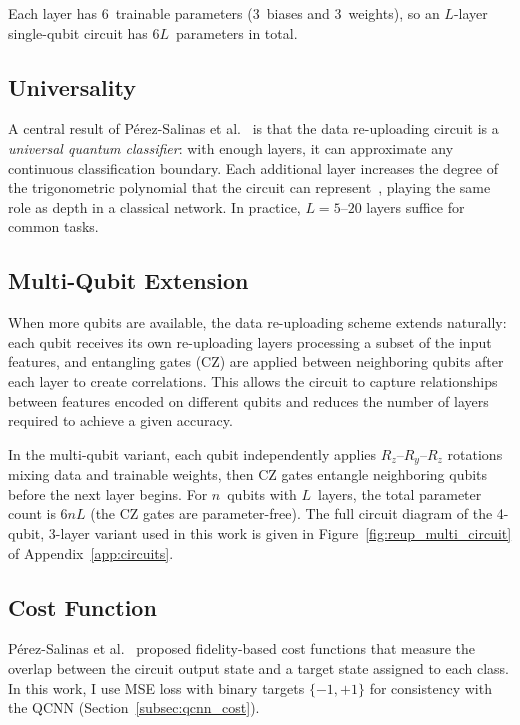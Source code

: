 Each layer has 6~trainable parameters (3~biases and 3~weights), so an $L$-layer single-qubit circuit has $6L$~parameters in total.

\subsection{Universality}

A central result of P\'erez-Salinas et al.~\cite{perez2020data} is that the data re-uploading circuit is a \emph{universal quantum classifier}: with enough layers, it can approximate any continuous classification boundary. Each additional layer increases the degree of the trigonometric polynomial that the circuit can represent~\cite{schuld2021effect}, playing the same role as depth in a classical network. In practice, $L = 5$--$20$ layers suffice for common tasks.

\subsection{Multi-Qubit Extension}

When more qubits are available, the data re-uploading scheme extends naturally: each qubit receives its own re-uploading layers processing a subset of the input features, and entangling gates (CZ) are applied between neighboring qubits after each layer to create correlations. This allows the circuit to capture relationships between features encoded on different qubits and reduces the number of layers required to achieve a given accuracy.

In the multi-qubit variant, each qubit independently applies $R_z$--$R_y$--$R_z$ rotations mixing data and trainable weights, then CZ gates entangle neighboring qubits before the next layer begins. For $n$~qubits with $L$~layers, the total parameter count is $6nL$ (the CZ gates are parameter-free). The full circuit diagram of the 4-qubit, 3-layer variant used in this work is given in Figure~\ref{fig:reup_multi_circuit} of Appendix~\ref{app:circuits}.
\subsection{Cost Function}
\label{subsec:reup_cost}

P\'erez-Salinas et al.~\cite{perez2020data} proposed fidelity-based cost functions that measure the overlap between the circuit output state and a target state assigned to each class. In this work, I use MSE loss with binary targets $\{-1,+1\}$ for consistency with the QCNN (Section~\ref{subsec:qcnn_cost}).

